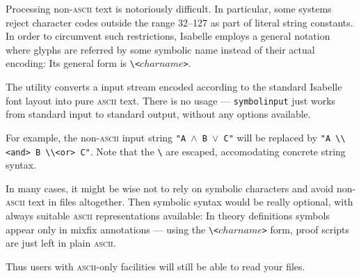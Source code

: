 Processing non-\textsc{ascii} text is notoriously difficult.  In
particular, some {\ML} systems reject character codes outside the
range 32--127 as part of literal string constants. In order to
circumvent such restrictions, Isabelle employs a general notation
where glyphs are referred by some symbolic name instead of their
actual encoding: Its general form is \verb|\<|$charname$\verb|>|.

The  utility converts a input stream encoded
according to the standard Isabelle font layout into pure
\textsc{ascii} text. There is no usage --- \texttt{symbolinput} just
works from standard input to standard output, without any options
available.

\medskip For example, the non-\textsc{ascii} input string \texttt{"A
  $\land$ B $\lor$ C"} will be replaced by \verb|"A \\<and> B \\<or> C"|.
Note that the \verb|\| are escaped, accomodating concrete {\ML} string
syntax.

\medskip In many cases, it might be wise not to rely on symbolic
characters and avoid non-\textsc{ascii} text in files altogether. Then
symbolic syntax would be really optional, with always suitable
\textsc{ascii} representations available: In theory definitions
symbols appear only in mixfix annotations --- using the
\verb|\<|$charname$\verb|>| form, proof scripts are just left in plain
\textsc{ascii}.

Thus users with \textsc{ascii}-only facilities will still be able to
read your files.


%
